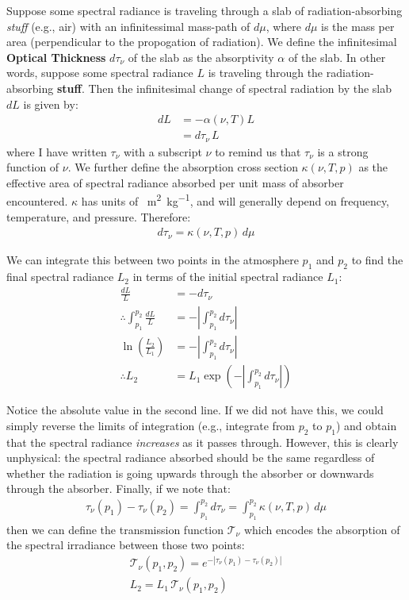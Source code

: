 Suppose some spectral radiance is traveling through a slab of radiation-absorbing \textit{stuff} (e.g., air) with an infinitessimal mass-path of $d\mu$, where $d\mu$ is the mass per area (perpendicular to the propogation of radiation). We define the infinitesimal \textbf{Optical Thickness} $d\tau_\nu$ of the slab as the absorptivity $\alpha$ of the slab. In other words, suppose some spectral radiance $L$ is traveling through the radiation-absorbing \textbf{stuff}. Then the infinitesimal change of spectral radiation by the slab $dL$ is given by:
\begin{align*}
    dL &= -\alpha(\nu,T)L\\
    &= d\tau_\nu\,L
\end{align*}
where I have written $\tau_\nu$ with a subscript $\nu$ to remind us that $\tau_\nu$ is a strong function of $\nu$. We further define the absorption cross section $\kappa(\nu,T,p)$ as the effective area of spectral radiance absorbed per unit mass of absorber encountered. $\kappa$ has units of \qty{}{\metre\squared\per\kilogram}, and will generally depend on frequency, temperature, and pressure. Therefore: 
\begin{align}
    \boxed{d\tau_\nu=\kappa(\nu,T,p)\,d\mu}
    \label{Optical Thickness}
\end{align}

We can integrate this between two points in the atmosphere $p_1$ and $p_2$ to find the final spectral radiance $L_{2}$ in terms of the initial spectral radiance $L_{1}$:
\begin{align*}
    \frac{dL}{L}&=-d\tau_\nu\\
    \therefore\int_{p_1}^{p_2}\frac{dL}{L}&=-\left|\int_{p_1}^{p_2}d\tau_\nu\right|\\
    \ln\left( \frac{L_2}{L_1} \right)&=-\left|\int_{p_1}^{p_2}d\tau_\nu\right|\\
    \therefore L_2&=L_1\exp\left(-\left|\int_{p_1}^{p_2}d\tau_\nu \right|\right)
\end{align*}

Notice the absolute value in the second line. If we did not have this, we could simply reverse the limits of integration (e.g., integrate from $p_2$ to $p_1$) and obtain that the spectral radiance \textit{increases} as it passes through. However, this is clearly unphysical: the spectral radiance absorbed should be the same regardless of whether the radiation is going upwards through the absorber or downwards through the absorber. Finally, if we note that:
\begin{align*}
    \tau_\nu(p_1)-\tau_\nu(p_2)=\int_{p_1}^{p_2}d\tau_\nu=\int_{p_1}^{p_2}\kappa(\nu,T,p)\,d\mu
\end{align*}
then we can define the transmission function $\mathcal{T}_\nu$ which encodes the absorption of the spectral irradiance between those two points:
\begin{align}
    \label{Absorption}
    \mathcal{T}_\nu(p_1,p_2)=e^{-|\tau_\nu(p_1)-\tau_\nu(p_2)|}
    \\
    L_2=L_1\,\mathcal{T}_\nu(p_1,p_2)\nonumber
\end{align}

